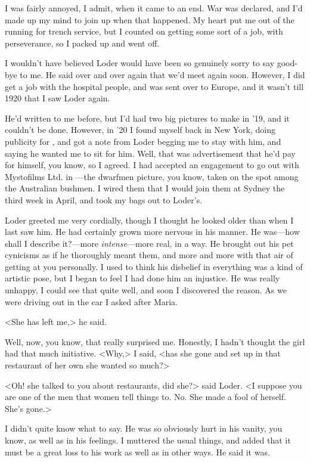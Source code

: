 I was fairly annoyed, I admit, when it came to an end. War was declared, and I'd made up my mind to join up when that happened. My heart put me out of the running for trench service, but I counted on getting some sort of a job, with perseverance, so I packed up and went off.

I wouldn't have believed Loder would have been so genuinely sorry to say good-bye to me. He said over and over again that we'd meet again soon. However, I did get a job with the hospital people, and was sent over to Europe, and it wasn't till 1920 that I saw Loder again.

He'd written to me before, but I'd had two big pictures to make in '19, and it couldn't be done. However, in '20 I found myself back in New York, doing publicity for , and got a note from Loder begging me to stay with him, and saying he wanted me to sit for him. Well, that was advertisement that he'd pay for himself, you know, so I agreed. I had accepted an engagement to go out with Mystofilms Ltd. in —the dwarfmen picture, you know, taken on the spot among the Australian bushmen. I wired them that I would join them at Sydney the third week in April, and took my bags out to Loder's.

Loder greeted me very cordially, though I thought he looked older than when I last saw him. He had certainly grown more nervous in his manner. He was—how shall I describe it?—more \emph{intense}—more real, in a way. He brought out his pet cynicisms as if he thoroughly meant them, and more and more with that air of getting at you personally. I used to think his disbelief in everything was a kind of artistic pose, but I began to feel I had done him an injustice. He was really unhappy, I could see that quite well, and soon I discovered the reason. As we were driving out in the car I asked after Maria.

<She has left me,> he said.

Well, now, you know, that really surprised me. Honestly, I hadn't thought the girl had that much initiative. <Why,> I said, <has she gone and set up in that restaurant of her own she wanted so much?>

<Oh! she talked to you about restaurants, did she?> said Loder. <I suppose you are one of the men that women tell things to. No. She made a fool of herself. She's gone.>

I didn't quite know what to say. He was so obviously hurt in his vanity, you know, as well as in his feelings. I muttered the usual things, and added that it must be a great loss to his work as well as in other ways. He said it was.


